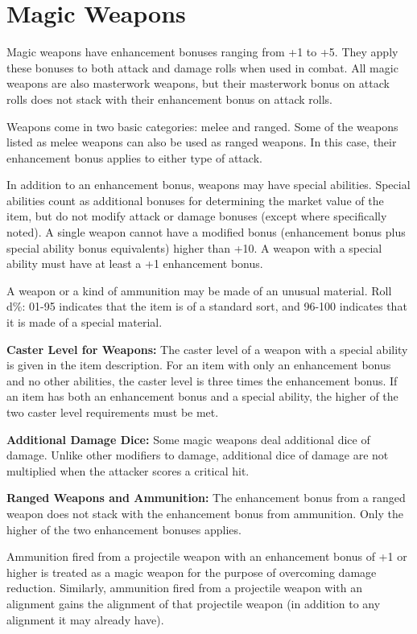 
\section{Magic Weapons}

Magic weapons have enhancement bonuses ranging from +1 to +5. They apply these 
bonuses to both attack and damage rolls when used in combat. All magic weapons 
are also masterwork weapons, but their masterwork bonus on attack rolls does not 
stack with their enhancement bonus on attack rolls.

Weapons come in two basic categories: melee and ranged. Some of the weapons listed 
as melee weapons can also be used as ranged weapons. In this case, their enhancement 
bonus applies to either type of attack.

In addition to an enhancement bonus, weapons may have special abilities. Special 
abilities count as additional bonuses for determining the market value of the item, 
but do not modify attack or damage bonuses (except where specifically noted). A 
single weapon cannot have a modified bonus (enhancement bonus plus special ability 
bonus equivalents) higher than +10. A weapon with a special ability must have at 
least a +1 enhancement bonus.

A weapon or a kind of ammunition may be made of an unusual material. Roll d\%: 
01-95 indicates that the item is of a standard sort, and 96-100 indicates that 
it is made of a special material.

\textbf{Caster Level for Weapons: }The caster level of a weapon with a special 
ability is given in the item description. For an item with only an enhancement 
bonus and no other abilities, the caster level is three times the enhancement bonus. 
If an item has both an enhancement bonus and a special ability, the higher of the 
two caster level requirements must be met.

\textbf{Additional Damage Dice:} Some magic weapons deal additional dice of damage. 
Unlike other modifiers to damage, additional dice of damage are not multiplied 
when the attacker scores a critical hit.

\textbf{Ranged Weapons and Ammunition:} The enhancement bonus from a ranged weapon 
does not stack with the enhancement bonus from ammunition. Only the higher of the 
two enhancement bonuses applies.

Ammunition fired from a projectile weapon with an enhancement bonus of +1 or higher 
is treated as a magic weapon for the purpose of overcoming damage reduction. Similarly, 
ammunition fired from a projectile weapon with an alignment gains the alignment 
of that projectile weapon (in addition to any alignment it may already have).

